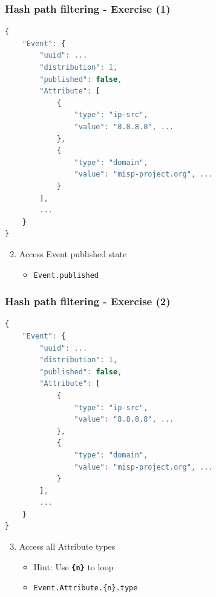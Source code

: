 \begin{frame}[fragile]
    \frametitle{Hash path filtering - Exercise (1)}

\begin{lstlisting}[language=javascript,firstnumber=1]
{
    "Event": {
        "uuid": ...
        "distribution": 1,
        "published": false,
        "Attribute": [
            {
                "type": "ip-src",
                "value": "8.8.8.8", ...
            },
            {
                "type": "domain",
                "value": "misp-project.org", ...
            }
        ],
        ...
    }
}
\end{lstlisting}
    \begin{enumerate}
        \setcounter{enumi}{1}
        \item Access Event published state
        \pause
        \begin{itemize}
            \item \texttt{Event.published}
        \end{itemize}
    \end{enumerate}
\end{frame}

\begin{frame}[fragile]
    \frametitle{Hash path filtering - Exercise (2)}

\begin{lstlisting}[language=javascript,firstnumber=1]
{
    "Event": {
        "uuid": ...
        "distribution": 1,
        "published": false,
        "Attribute": [
            {
                "type": "ip-src",
                "value": "8.8.8.8", ...
            },
            {
                "type": "domain",
                "value": "misp-project.org", ...
            }
        ],
        ...
    }
}
\end{lstlisting}
    \begin{enumerate}
        \setcounter{enumi}{2}
        \item Access all Attribute types
        \begin{itemize}
            \item Hint: Use \texttt{\bf \{n\}} to loop 
            \pause
            \item \texttt{Event.Attribute.\{n\}.type}
        \end{itemize}
    \end{enumerate}
\end{frame}

